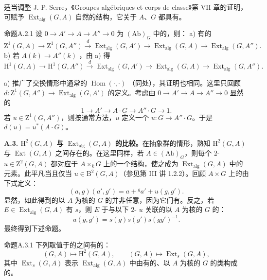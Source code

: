 适当调整 J.-P. Serre，《Groupes algébriques et corps de classe》第 VII 章的证明，可赋予 $\operatorname{Ext}_{\mathrm{alg}}(G,A)$ 自然的结构，它关于 $A$、$G$ 都具有。
\begin{SGAresult}{命题}{A.2.1}
设 $0\to A'\to A\to A''\to0$ 为 $(\mathrm{Ab})_G$ 中的，则：
a) 有的
\[\mathrm Z^1(G,A)\to\mathrm Z^1(G,A'')\xrightarrow d\operatorname{Ext}_{\mathrm{alg}}(G,A')\to\operatorname{Ext}_{\mathrm{alg}}(G,A)\to\operatorname{Ext}_{\mathrm{alg}}(G,A'').\]
b) 若 $A(k)\to A''(k)$ ，由 a) 得
\[\mathrm H^1(G,A)\to\mathrm H^1(G,A'')\xrightarrow d\operatorname{Ext}_{\mathrm{alg}}(G,A')\to\operatorname{Ext}_{\mathrm{alg}}(G,A)\to\operatorname{Ext}_{\mathrm{alg}}(G,A'').\tag{2}\]
\end{SGAresult}
 a) 推广了交换情形中通常的 $\operatorname{Hom}(\cdot,\cdot)$ （同处），其证明也相同。这里只回顾 $d:\mathrm Z^1(G,A'')\to\operatorname{Ext}_{\mathrm{alg}}(G,A')$ 的定义。考虑由 $0\to A'\to A\to A''\to0$ 显然的
\[1\longrightarrow A'\longrightarrow A\cdot G\longrightarrow A''\cdot G\longrightarrow1.\]
若 $u\in\mathrm Z^1(G,A'')$，则按通常方法，$u$ 定义一个 $u:G\to A''\cdot G$。于是 $d(u)=u^*(A\cdot G)$。

\textbf{A.3. $\mathrm H^2(G,A)$ 与 $\operatorname{Ext}_{\mathrm{alg}}(G,A)$ 的比较。}在抽象群的情形，熟知 $\mathrm H^2(G,A)$ 与 $\operatorname{Ext}(G,A)$ 之间存在的。在这里同样，若 $A\in(\mathrm{Ab})_G$，则每个 $2$- $u\in\mathrm Z^2(G,A)$ 都对应于 $A\times_kG$ 上的一个结构，使之成为 $\operatorname{Ext}_{\mathrm{alg}}(G,A)$ 中的元素。此平凡当且仅当 $u\in\mathrm B^2(G,A)$（参见第 III 讲 1.2.2）。回顾 $A\times G$ 上的由下式定义：
\[(a,g)(a',g')=a+{}^ga'+u(g,g').\]
显然，如此得到的以 $A$ 为核的 $G$ 的并非任意，因为它们有。反之，若 $E\in\operatorname{Ext}_{\mathrm{alg}}(G,A)$ 有 $s$，则 $E$ 于与以下 $2$- $u$ 关联的以 $A$ 为核的 $G$ 的：
\[u(g,g')=s(g)s(g')s(gg')^{-1}.\]
最终得到下述命题。
\begin{SGAresult}{命题}{A.3.1}
下列取值于的之间有的：
\[(G,A)\longmapsto\mathrm H^2(G,A),\qquad(G,A)\longmapsto\operatorname{Ext}_s(G,A),\]
其中 $\operatorname{Ext}_s(G,A)$ 表示 $\operatorname{Ext}_{\mathrm{alg}}(G,A)$ 中由有的、以 $A$ 为核的 $G$ 的类构成的。
\end{SGAresult}

